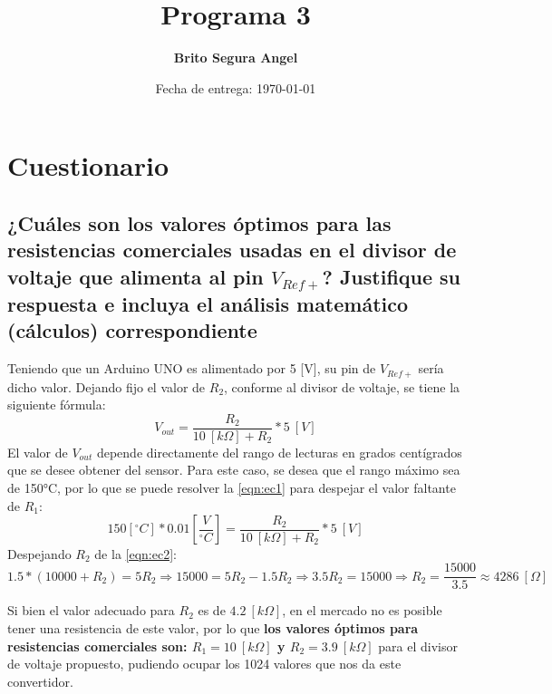 \documentclass[letterpaper,10.5pt]{article} %
\title{Programa 3}
\author{\textbf{Brito Segura Angel}}
\date{Fecha de entrega: \today}
\begin{document}
    \pagestyle{fancy} %
    \maketitle %
    
    \section{Cuestionario}
    \subsection{¿Cuáles son los valores óptimos para las resistencias comerciales usadas en el divisor de voltaje que alimenta al pin $V_{Ref+}$? Justifique su respuesta e incluya el análisis matemático (cálculos) correspondiente}
	    Teniendo que un Arduino UNO es alimentado por 5 [V], su pin de $V_{Ref+}$ sería dicho valor. Dejando fijo el valor de $R_2$, conforme al divisor de voltaje, se tiene la siguiente fórmula:
	    \begin{equation}
			\label{eqn:ec1}
			V_{out} = \frac{R_2}{10~[k\Omega] + R_2} * 5~[V]
		\end{equation}
		El valor de $V_{out}$ depende directamente del rango de lecturas en grados centígrados que se desee obtener del sensor. Para este caso, se desea que el rango máximo sea de 150°C, por lo que se puede resolver la \cref{eqn:ec1} para despejar el valor faltante de $R_1$:
		\begin{equation}
			\label{eqn:ec2}
			150[^{\circ} C]* 0.01\left[\frac{V}{^{\circ} C}\right] = \frac{R_2}{10~[k\Omega] + R_2} * 5~[V]
		\end{equation}
		Despejando $R_2$ de la \cref{eqn:ec2}:
		\[
			1.5 * (10000 + R_2) = 5R_2 \Rightarrow 15000 = 5R_2 - 1.5R_2 \Rightarrow 3.5R_2 = 15000 \Rightarrow R_2 = \frac{15000}{3.5}\approx 4286~[\Omega]
		\]

		Si bien el valor adecuado para $R_2$ es de $4.2~[k\Omega]$, en el mercado \cite{res_comerciales} no es posible tener una resistencia de este valor, por lo que \textbf{los valores óptimos para resistencias comerciales son: $R_1 = 10~[k\Omega]$ y $R_2 = 3.9~[k\Omega]$} para el divisor de voltaje propuesto, pudiendo ocupar los 1024 valores que nos da este convertidor.\newline
\end{document}
